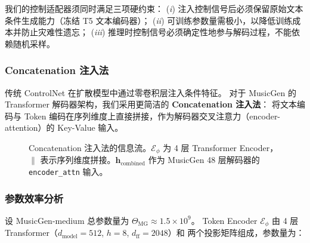 \documentclass[UTF8,12pt,a4paper]{ctexart}
\begin{document}
我们的控制适配器须同时满足三项硬约束：
(\textit{i}) 注入控制信号后必须保留原始文本条件生成能力（冻结 T5 文本编码器）；
(\textit{ii}) 可训练参数量需极小，以降低训练成本并防止灾难性遗忘；
(\textit{iii}) 推理时控制信号必须确定性地参与解码过程，不能依赖随机采样。

\subsubsection{Concatenation 注入法}

传统 ControlNet 在扩散模型中通过零卷积层注入条件特征\cite{controlnet}。
对于 MusicGen 的 Transformer 解码器架构，我们采用更简洁的 \textbf{Concatenation 注入法}：
将文本编码与 Token 编码在序列维度上直接拼接，作为解码器交叉注意力（encoder-attention）的 Key-Value 输入。

\begin{figure}[H]
\centering
{}
\caption{Concatenation 注入法的信息流。$\mathcal{E}_{\phi}$ 为 4 层 Transformer Encoder，
$\|$ 表示序列维度拼接。$\mathbf{h}_{\text{combined}}$ 作为 MusicGen 48 层解码器的
\texttt{encoder\_attn} 输入。}
\label{fig:adapter_arch}
\end{figure}

\subsubsection{参数效率分析}

设 MusicGen-medium 总参数量为 $\Theta_{\text{MG}} \approx 1.5\times 10^9$。
Token Encoder $\mathcal{E}_{\phi}$ 由 4 层 Transformer（$d_{\text{model}}=512$, $h=8$, $d_{\text{ff}}=2048$）和
两个投影矩阵组成，参数量为：
\end{document}

